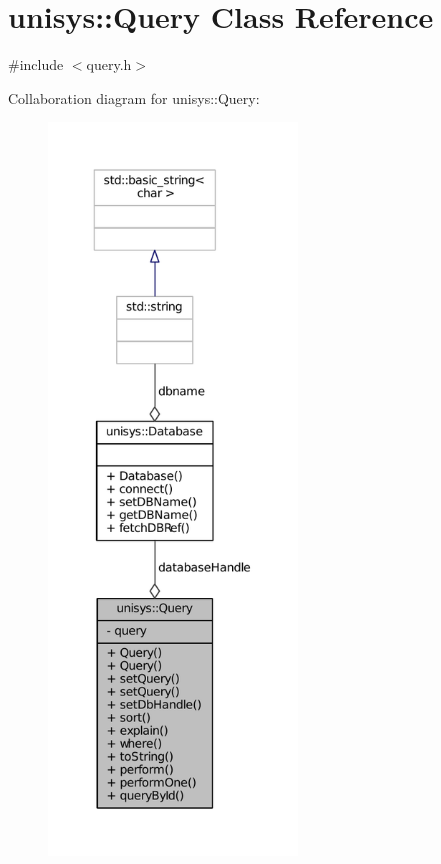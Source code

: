 \hypertarget{classunisys_1_1Query}{\section{unisys\-:\-:Query Class Reference}
\label{classunisys_1_1Query}
}


{\ttfamily \#include $<$query.\-h$>$}



Collaboration diagram for unisys\-:\-:Query\-:
\nopagebreak
\begin{figure}[H]
\begin{center}
\leavevmode
\includegraphics[height=550pt]{classunisys_1_1Query__coll__graph}
\end{center}
\end{figure}

